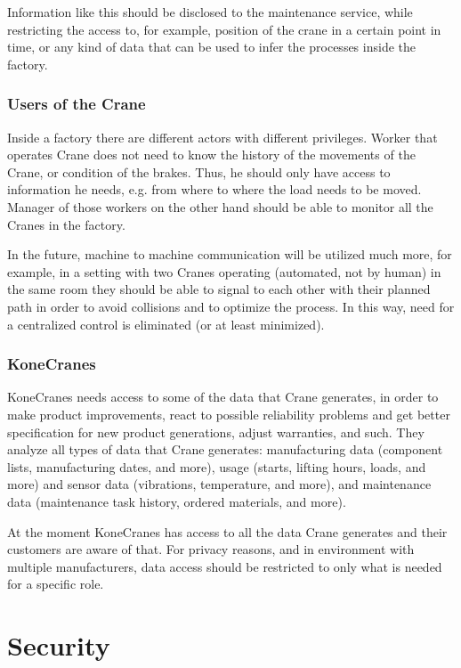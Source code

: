 Information like this should be disclosed to the maintenance service, while
restricting the access to, for example, position of the crane in a certain
point in time, or any kind of data that can be used to infer the processes
inside the factory.

\subsubsection{Users of the Crane}

Inside a factory there are different actors with different privileges. Worker that
operates Crane does not need to know the history of the movements of the Crane, or 
condition of the brakes. Thus, he should only have access to information he needs, e.g. 
from where to where the load needs to be moved.
Manager of those workers on the other hand should be able to monitor all the Cranes in
the factory.

In the future, machine to machine communication will be utilized much more, for example, 
in a setting with two Cranes operating (automated, not by human) in the same room they 
should be able to signal to each other with their planned path in order to avoid collisions
and to optimize the process. In this way, need for a centralized control is eliminated (or at
least minimized).

\subsubsection{KoneCranes}

KoneCranes needs access to some of the data that Crane generates, in order to make product improvements, react to possible reliability problems and get better specification for new product generations, adjust warranties, and such.
They analyze all types of data that Crane generates: manufacturing data (component lists, manufacturing dates, and more), usage (starts, lifting hours, loads, and more) and sensor data (vibrations, temperature, and more), and maintenance data (maintenance task history, ordered materials, and more).

At the moment KoneCranes has access to all the data Crane generates and their customers are aware
of that. For privacy reasons, and in environment with multiple manufacturers, data access should be restricted to only what is needed for a specific role. 

\section{Security }
